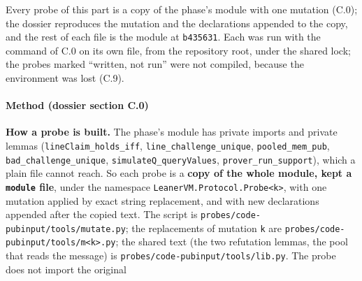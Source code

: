 Every probe of this part is a copy of the phase's module with one mutation (C.0); the dossier reproduces the mutation and the declarations appended to the copy, and the rest of each file is the module at \texttt{b435631}. Each was run with the command of C.0 on its own file, from the repository root, under the shared lock; the probes marked \enquote{written, not run} were not compiled, because the environment was lost (C.9).

\paragraph{Method (dossier section C.0)}\label{sec:gen-pubinput-C0}

\textbf{How a probe is built.} The phase's module has private imports and private lemmas (\texttt{lineClaim\_\allowbreak{}holds\_\allowbreak{}iff}, \texttt{line\_\allowbreak{}challenge\_\allowbreak{}unique}, \texttt{pooled\_\allowbreak{}mem\_\allowbreak{}pub}, \texttt{bad\_\allowbreak{}challenge\_\allowbreak{}unique}, \texttt{simulateQ\_\allowbreak{}queryValues}, \texttt{prover\_\allowbreak{}run\_\allowbreak{}support}), which a plain file cannot reach. So each probe is a \textbf{copy of the whole module, kept a \texttt{module} file}, under the namespace \texttt{LeanerVM.\allowbreak{}Protocol.\allowbreak{}Probe<k>}, with one mutation applied by exact string replacement, and with new declarations appended after the copied text. The script is \texttt{p\allowbreak{}r\allowbreak{}o\allowbreak{}b\allowbreak{}e\allowbreak{}s\allowbreak{}/\allowbreak{}c\allowbreak{}o\allowbreak{}d\allowbreak{}e\allowbreak{}-{}\allowbreak{}p\allowbreak{}u\allowbreak{}b\allowbreak{}i\allowbreak{}n\allowbreak{}p\allowbreak{}u\allowbreak{}t\allowbreak{}/\allowbreak{}t\allowbreak{}o\allowbreak{}o\allowbreak{}l\allowbreak{}s\allowbreak{}/\allowbreak{}m\allowbreak{}u\allowbreak{}t\allowbreak{}a\allowbreak{}t\allowbreak{}e\allowbreak{}.\allowbreak{}p\allowbreak{}y}; the replacements of mutation \texttt{k} are \texttt{p\allowbreak{}r\allowbreak{}o\allowbreak{}b\allowbreak{}e\allowbreak{}s\allowbreak{}/\allowbreak{}c\allowbreak{}o\allowbreak{}d\allowbreak{}e\allowbreak{}-{}\allowbreak{}p\allowbreak{}u\allowbreak{}b\allowbreak{}i\allowbreak{}n\allowbreak{}p\allowbreak{}u\allowbreak{}t\allowbreak{}/\allowbreak{}t\allowbreak{}o\allowbreak{}o\allowbreak{}l\allowbreak{}s\allowbreak{}/\allowbreak{}m\allowbreak{}<\allowbreak{}k\allowbreak{}>\allowbreak{}.\allowbreak{}p\allowbreak{}y}; the shared text (the two refutation lemmas, the pool that reads the message) is \texttt{p\allowbreak{}r\allowbreak{}o\allowbreak{}b\allowbreak{}e\allowbreak{}s\allowbreak{}/\allowbreak{}c\allowbreak{}o\allowbreak{}d\allowbreak{}e\allowbreak{}-{}\allowbreak{}p\allowbreak{}u\allowbreak{}b\allowbreak{}i\allowbreak{}n\allowbreak{}p\allowbreak{}u\allowbreak{}t\allowbreak{}/\allowbreak{}t\allowbreak{}o\allowbreak{}o\allowbreak{}l\allowbreak{}s\allowbreak{}/\allowbreak{}l\allowbreak{}i\allowbreak{}b\allowbreak{}.\allowbreak{}p\allowbreak{}y}. The probe does not import the original 